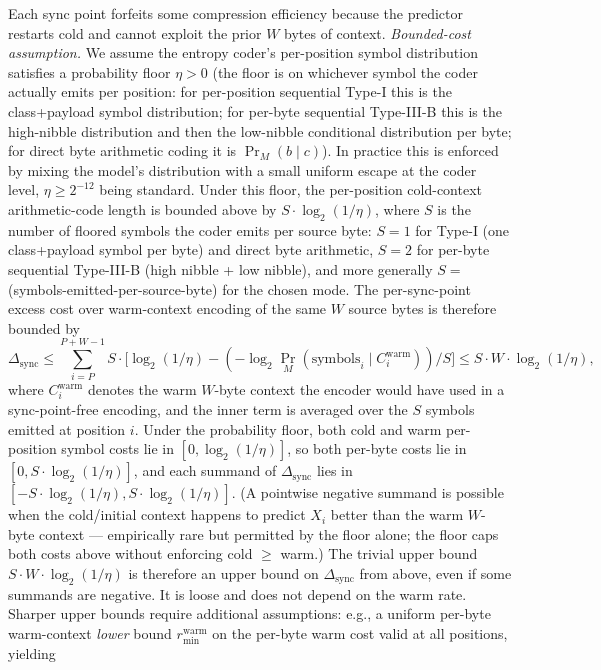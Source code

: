 \documentclass[
]{article}
\begin{document}
Each sync point forfeits some compression efficiency because the
predictor restarts cold and cannot exploit the prior $W$ bytes of
context. \emph{Bounded-cost assumption.} We assume the entropy
coder's per-position symbol distribution satisfies a probability
floor $\eta > 0$ (the floor is on whichever symbol the coder
actually emits per position: for per-position sequential Type-I
this is the class+payload symbol distribution; for per-byte
sequential Type-III-B this is the high-nibble distribution and
then the low-nibble conditional distribution per byte; for direct
byte arithmetic coding it is $\Pr_M(b \mid c)$). In practice this
is enforced by mixing the model's distribution with a small
uniform escape at the coder level, $\eta \geq 2^{-12}$ being
standard. Under this floor, the per-position cold-context
arithmetic-code length is bounded above by $S \cdot \log_2(1/\eta)$,
where $S$ is the number of floored symbols the coder emits per
source byte: $S = 1$ for Type-I (one class+payload symbol per
byte) and direct byte arithmetic, $S = 2$ for per-byte sequential
Type-III-B (high nibble + low nibble), and more generally
$S = $ (symbols-emitted-per-source-byte) for the chosen mode. The
per-sync-point excess cost over warm-context encoding of the same
$W$ source bytes is therefore bounded by
\[
\Delta_{\mathrm{sync}} \leq \sum_{i=P}^{P+W-1}
S \cdot \bigl[\log_2(1/\eta) - (-\log_2 \Pr_M(\text{symbols}_i \mid C_i^{\mathrm{warm}}))/S\bigr]
\leq S \cdot W \cdot \log_2(1/\eta),
\]
where $C_i^{\mathrm{warm}}$ denotes the warm $W$-byte context the
encoder would have used in a sync-point-free encoding, and the
inner term is averaged over the $S$ symbols emitted at position
$i$. Under the probability floor, both cold and warm per-position
symbol costs lie in $[0, \log_2(1/\eta)]$, so both per-byte costs
lie in $[0, S \cdot \log_2(1/\eta)]$, and each summand of
$\Delta_{\mathrm{sync}}$ lies in $[-S \cdot \log_2(1/\eta), S
\cdot \log_2(1/\eta)]$. (A pointwise negative summand is possible
when the cold/initial context happens to predict $X_i$ better
than the warm $W$-byte context --- empirically rare but
permitted by the floor alone; the floor caps both costs above
without enforcing cold $\geq$ warm.) The trivial upper bound
$S \cdot W \cdot \log_2(1/\eta)$ is therefore an upper bound on
$\Delta_{\mathrm{sync}}$ from above, even if some summands are
negative. It is loose and does not depend on the warm rate. Sharper upper
bounds require additional assumptions: e.g., a uniform per-byte
warm-context \emph{lower} bound $r^{\mathrm{warm}}_{\min}$ on the
per-byte warm cost valid at all positions, yielding
\end{document}
